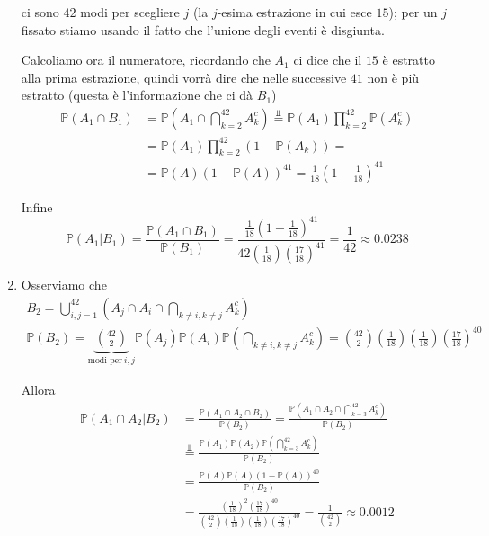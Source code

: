\begin{enumerate}
ci sono $42$ modi per scegliere $j$ (la $j$-esima estrazione in cui esce $15$); per un $j$ fissato stiamo usando il fatto che l'unione degli eventi è disgiunta.

Calcoliamo ora il numeratore, ricordando che $A_{1}$ ci dice che il $15$ è estratto alla prima estrazione, quindi vorrà dire che nelle successive $41$ non è più estratto (questa è l'informazione che ci dà $B_{1}$)\begin{equation*}
\begin{aligned}
\mathbb{P}( A_{1} \cap B_{1}) & =\mathbb{P}\left( A_{1} \cap \bigcap _{k=2}^{42} A_{k}^{c}\right)\overset{\Bot }{=}\mathbb{P}( A_{1})\prod _{k=2}^{42}\mathbb{P}\left( A_{k}^{c}\right)\\
 & =\mathbb{P}( A_{1})\prod _{k=2}^{42}( 1-\mathbb{P}( A_{k})) =\\
 & =\mathbb{P}( A)( 1-\mathbb{P}( A))^{41} =\frac{1}{18}\left( 1-\frac{1}{18}\right)^{41}
\end{aligned}
\end{equation*}

Infine\begin{equation*}
\mathbb{P}( A_{1} |B_{1}) =\frac{\mathbb{P}( A_{1} \cap B_{1})}{\mathbb{P}( B_{1})} =\frac{\frac{1}{18}\left( 1-\frac{1}{18}\right)^{41}}{42\left(\frac{1}{18}\right)\left(\frac{17}{18}\right)^{41}} =\frac{1}{42} \approx 0.0238
\end{equation*}
\item Osserviamo che\begin{gather*}
B_{2} =\bigcup _{i,j=1}^{42}\left( A_{j} \cap A_{i} \cap \bigcap _{k\neq i,k\neq j} A_{k}^{c}\right)\\
\mathbb{P}( B_{2}) =\underbrace{\binom{42}{2}}_{\text{modi per} \ i,j}\mathbb{P}( A_{j})\mathbb{P}( A_{i})\mathbb{P}\left(\bigcap _{k\neq i,k\neq j} A_{k}^{c}\right) =\binom{42}{2}\left(\frac{1}{18}\right)\left(\frac{1}{18}\right)\left(\frac{17}{18}\right)^{40}
\end{gather*}

Allora\begin{equation*}
\begin{aligned}
\mathbb{P}( A_{1} \cap A_{2} |B_{2}) & =\frac{\mathbb{P}( A_{1} \cap A_{2} \cap B_{2})}{\mathbb{P}( B_{2})} =\frac{\mathbb{P}\left( A_{1} \cap A_{2} \cap \bigcap _{k=3}^{42} A_{k}^{c}\right)}{\mathbb{P}( B_{2})}\\
 & \overset{\Bot }{=}\frac{\mathbb{P}( A_{1})\mathbb{P}( A_{2})\mathbb{P}\left(\bigcap _{k=3}^{42} A_{k}^{c}\right)}{\mathbb{P}( B_{2})}\\
 & =\frac{\mathbb{P}( A)\mathbb{P}( A)( 1-\mathbb{P}( A))^{40}}{\mathbb{P}( B_{2})}\\
 & =\frac{\left(\frac{1}{18}\right)^{2}\left(\frac{17}{18}\right)^{40}}{\binom{42}{2}\left(\frac{1}{18}\right)\left(\frac{1}{18}\right)\left(\frac{17}{18}\right)^{40}} =\frac{1}{\binom{42}{2}} \approx 0.0012
\end{aligned}
\end{equation*}


\end{enumerate}
